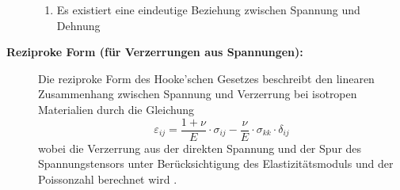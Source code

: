 \begin{description}
\begin{enumerate}
	 	\item Es existiert eine eindeutige Beziehung zwischen Spannung und Dehnung
	 \end{enumerate}
	 \item[\textbf{Reziproke Form (für Verzerrungen aus Spannungen):}] Die reziproke Form des Hooke’schen Gesetzes beschreibt den linearen Zusammenhang zwischen Spannung und Verzerrung bei isotropen Materialien durch die Gleichung
	 \begin{equation}
	 	\varepsilon_{ij} = 
	 	\frac{1+\nu}{E} \cdot \sigma_{ij} - \frac{\nu}{E} \cdot \sigma_{kk} \cdot \delta_{ij}
	 \end{equation}
	 wobei die Verzerrung aus der direkten Spannung und der Spur des Spannungstensors unter Berücksichtigung des Elastizitätsmoduls und der Poissonzahl berechnet wird \cite{elastomechanik:Grundlagen der Elastizitaetstheorie}.
\end{description}